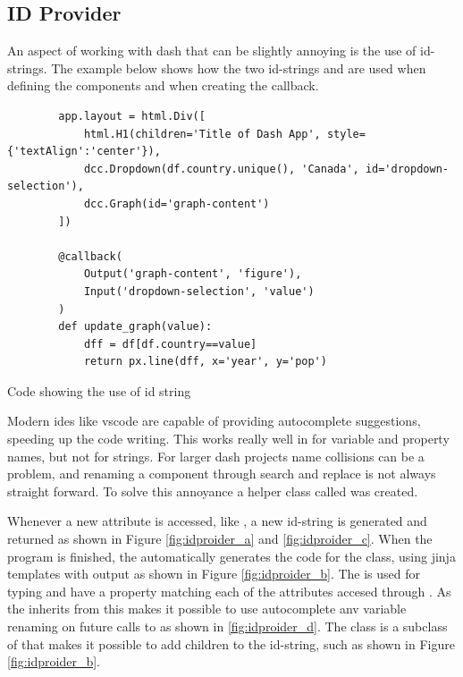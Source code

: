 

\subsection{ID Provider}
An aspect of working with \gls{dash} that can be slightly annoying is the use of id-strings.
The example below shows how the two id-strings  and  are used when defining the components and when creating the callback.
\begin{listing}[H]
    \begin{verbatim}
        app.layout = html.Div([
            html.H1(children='Title of Dash App', style={'textAlign':'center'}),
            dcc.Dropdown(df.country.unique(), 'Canada', id='dropdown-selection'),
            dcc.Graph(id='graph-content')
        ])

        @callback(
            Output('graph-content', 'figure'),
            Input('dropdown-selection', 'value')
        )
        def update_graph(value):
            dff = df[df.country==value]
            return px.line(dff, x='year', y='pop')
    \end{verbatim}
    \caption{Code showing the use of id string \cite{plotlyMinimalDashApp}}
\end{listing}

Modern \glspl{ide} like \gls{vscode} are capable of providing autocomplete suggestions, speeding up the code writing.
This works really well in for variable and property names, but not for strings.
For larger \gls{dash} projects name collisions can be a problem, and renaming a component through search and replace is not always straight forward.
To solve this annoyance a helper class called  was created.

Whenever a new attribute is accessed, like , a new id-string is generated and returned as shown in Figure \ref{fig:idproider_a} and \ref{fig:idproider_c}.
When the program is finished, the  automatically generates the code for the  class, using \gls{jinja} templates with output as shown in Figure \ref{fig:idproider_b}.
The  is used for typing and have a property matching each of the attributes accesed through .
As the  inherits from  this makes it possible to use autocomplete anv variable renaming on future calls to  as shown in \ref{fig:idproider_d}.
The  class is a subclass of  that makes it possible to add children to the id-string, such as  shown in Figure \ref{fig:idproider_b}.

